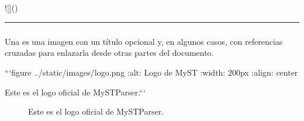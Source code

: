 \documentclass[a4paper,10pt,oneside,spanish,openany]{sphinxmanual}
\let\sphinxpxdimen\pdfpxdimen\else\newdimen\sphinxpxdimen
\begin{document}
\subparagraph{}
\label{\detokenize{configuracion_inicial/013.guia_de_myst_parser:ejemplo}}
\begin{sphinxVerbatim}[commandchars=\\\{\}]
![]()
\end{sphinxVerbatim}

\sphinxAtStartPar
{}

\sphinxAtStartPar
{}


\bigskip\hrule\bigskip



\subsubsection{}
\label{\detokenize{configuracion_inicial/013.guia_de_myst_parser:figuras-con-titulo-y-referencia}}

\paragraph{}
\label{\detokenize{configuracion_inicial/013.guia_de_myst_parser:insertar-una-figura-con-titulo}}
\sphinxAtStartPar
Una  es una imagen con un título opcional y, en algunos casos, con referencias cruzadas para enlazarla desde otras partes del documento.

\begin{sphinxVerbatim}[commandchars=\\\{\}]
  ```\PYGZob{}figure\PYGZcb{} ../\PYGZus{}static/images/logo.png
  :alt: Logo de MyST
  :width: 200px
  :align: center

  Este es el logo oficial de MyST\PYGZhy{}Parser.```
\end{sphinxVerbatim}

\sphinxAtStartPar
{}

\begin{figure}[htbp]
\centering
\capstart

\noindent\sphinxincludegraphics[width=200\sphinxpxdimen]{{logo}.png}
\caption{Este es el logo oficial de MyST\sphinxhyphen{}Parser.}\label{\detokenize{configuracion_inicial/013.guia_de_myst_parser:fig-logo}}\end{figure}
\end{document}
